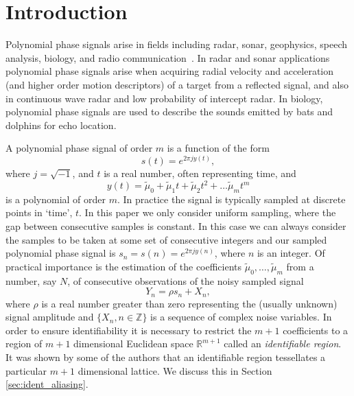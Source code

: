 \documentclass[aap]{imsart}
\newcommand{\reals}{{\mathbb R}}
\newcommand{\ints}{{\mathbb Z}}
\begin{document}
 



\section{Introduction} \label{intro}

Polynomial phase signals arise in fields including radar, sonar, geophysics, speech analysis, biology, and radio communication~\cite{Hlawatsch_lin_quad_time_freq_spmag_1992,Ridleyspeechpolyphase1989, Suga_1975_bats_echolocation, Moss_2005echolocation}. In radar and sonar applications polynomial phase signals arise when acquiring radial velocity and acceleration (and higher order motion descriptors) of a target from a reflected signal, and also in continuous wave radar and low probability of intercept radar.  In biology, polynomial phase signals are used to describe the sounds emitted by bats and dolphins for echo location.  

A polynomial phase signal of order $m$ is a function of the form
\[
s(t) = e^{2\pi j y(t)},
\]
where $j = \sqrt{-1}$, and $t$ is a real number, often representing time, and 
\[
y(t) = \tilde{\mu}_0 +\tilde{\mu}_1 t + \tilde{\mu}_2 t^2 + \dots \tilde{\mu}_m t^m
\]
is a polynomial of order $m$.  In practice the signal is typically sampled at discrete points in `time', $t$. In this paper we only consider uniform sampling, where the gap between consecutive samples is constant. In this case we can always consider the samples to be taken at some set of consecutive integers and our sampled polynomial phase signal is $s_n = s(n) = e^{2\pi j y(n)}$, where $n$ is an integer.  Of practical importance is the estimation of the coefficients $\tilde{\mu}_0, \dots, \tilde{\mu}_m$ from a number, say $N$, of consecutive observations of the noisy sampled signal
\begin{equation}\label{eq:Y_nsamplednoisey}
Y_n = \rho s_n + X_n,
\end{equation}
where $\rho$ is a real number greater than zero representing the (usually unknown) signal amplitude and $\{X_n, n \in \ints\}$ is a sequence of complex noise variables. In order to ensure identifiability it is necessary to restrict the $m+1$ coefficients to a region of $m+1$ dimensional Euclidean space $\reals^{m+1}$ called an \emph{identifiable region}.  It was shown by some of the authors \cite{McKilliam2009IndentifiabliltyAliasingPolyphase} that an identifiable region tessellates a particular $m+1$ dimensional lattice.  We discuss this in Section \ref{sec:ident_aliasing}.
\end{document}
